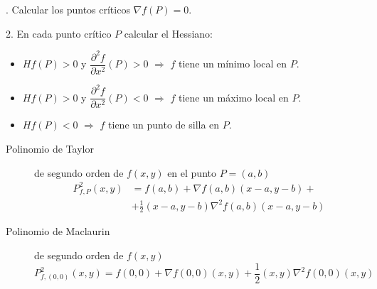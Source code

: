 \begin{multicols}{2}
\begin{tcolorbox}[hbox, title=Extremos locales y puntos de silla]
\begin{minipage}{0.4\textwidth}
. Calcular los puntos críticos $\nabla f(P)=0$.

2. En cada punto crítico $P$ calcular el Hessiano:
\begin{itemize}
\item $Hf(P)>0$ y $\dfrac{\partial^2 f}{\partial x^2}(P)>0$ $\Rightarrow$ $f$ tiene un mínimo local en $P$.
\item $Hf(P)>0$ y $\dfrac{\partial^2 f}{\partial x^2}(P)<0$ $\Rightarrow$ $f$ tiene un máximo local en $P$.
\item $Hf(P)<0$ $\Rightarrow$ $f$ tiene un punto de silla en $P$.
\end{itemize}
\end{minipage}
\end{tcolorbox}

\begin{tcolorbox}[hbox, title=Aproximación de funciones]
\begin{minipage}{0.4\textwidth}
\flushleft
\begin{description}
\item[Polinomio de Taylor] de segundo orden de $f(x,y)$ en el punto $P=(a,b)$
      \[
      \begin{split}
      P^2_{f,P}(x,y)&=f(a,b)+\nabla f(a,b)(x-a,y-b)+\\
      &+\frac{1}{2}(x-a,y-b)\nabla^2f(a,b)(x-a,y-b)
      \end{split}
      \]
\item[Polinomio de Maclaurin] de segundo orden de $f(x,y)$
      \[
      P^2_{f,(0,0)}(x,y)=f(0,0)+\nabla f(0,0)(x,y)+\frac{1}{2}(x,y)\nabla^2f(0,0)(x,y)
      \]
\end{description}
\end{minipage}
\end{tcolorbox}

\end{multicols}

